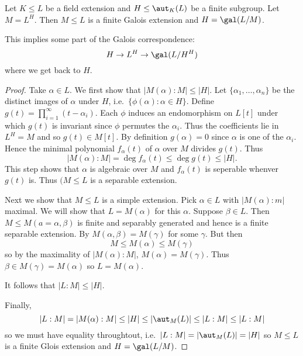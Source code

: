 \documentclass[a4paper]{article}
\begin{document}
\begin{theorem}[Artin's]
  \label{thm:artin}
  Let \(K \leq L\) be a field extension and \(H \leq \aut_K(L)\) be a finite subgroup. Let \(M = L^H\). Then \(M \leq L\) is a finite Galois extension and \(H = \gal(L/M)\).
\end{theorem}

\begin{remark}
  This implies some part of the Galois correspondence:
  \[
    H \to L^H \to \gal(L/H^H)
  \]
  where we get back to \(H\).
\end{remark}

\begin{proof}
  Take \(\alpha \in L\). We first show that \(|M(\alpha):M| \leq |H|\). Let \(\{\alpha_1, \dots, \alpha_n\}\) be the distinct images of \(\alpha\) under \(H\), i.e.\ \(\{\phi(\alpha): \alpha \in H\}\). Define \(g(t) = \prod_{i = 1}^{\infty} (t - \alpha_i) \). Each \(\phi\) induces an endomorphism on \(L[t]\) under which \(g(t)\) is invariant since \(\phi\) permutes the \(\alpha_i\). Thus the coefficients lie in \(L^H = M\) and so \(g(t) \in M[t]\). By definition \(g(\alpha) = 0\) since \(\alpha\) is one of the \(\alpha_i\). Hence the minimal polynomial \(f_\alpha(t)\) of \(\alpha\) over \(M\) divides \(g(t)\). Thus
  \[
    |M(\alpha):M| = \deg f_\alpha(t) \leq \deg g(t) \leq |H|.
  \]
  This step shows that \(\alpha\) is algebraic over \(M\) and \(f_\alpha(t)\) is seperable whenver \(g(t)\) is. Thus \((M \leq L\) is a separable extension.

  Next we show that \(M \leq L\) is a simple extension. Pick \(\alpha \in L\) with \(|M(\alpha):m|\) maximal. We will show that \(L = M(\alpha)\) for this \(\alpha\). Suppose \(\beta \in L\). Then \(M \leq M(a=\alpha, \beta)\) is finite and separably generated and hence is a finite separable extension. By  \(M(\alpha, \beta) = M(\gamma)\) for some \(\gamma\). But then
  \[
    M \leq M(\alpha) \leq M(\gamma)
  \]
  so by the maximality of \(|M(\alpha):M|\), \(M(\alpha) = M(\gamma)\). Thus \(\beta \in M(\gamma) = M(\alpha)\) so \(L = M(\alpha)\).

  It follows that \(|L:M| \leq |H|\).

  Finally,
  \[
    |L:M| = |M(\alpha):M| \leq |H| \leq |\aut_M(L)| \leq |L:M| \leq |L:M|
  \]
  so we must have equality throughtout, i.e.\ \(|L:M| = |\aut_M(L)| = |H|\) so \(M \leq L\) is a finite Glois extension and \(H = \gal(L/M)\).
\end{proof}
\end{document}
